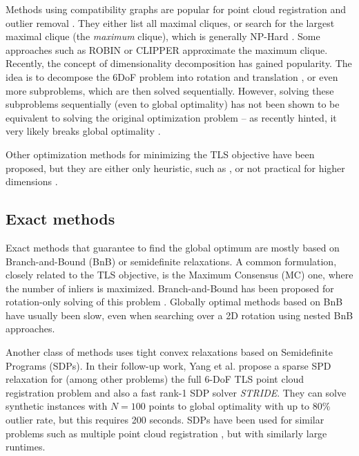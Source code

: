 Methods using compatibility graphs are popular for point cloud registration \cite{Yang20tro-teaser, SC2-PCR-Chen-2022-CVPR, 10161215, lim2024kissmatcherfastrobustpoint} and outlier removal \cite{7410607, 10091912, zhang20233d}. They either list all maximal cliques, or search for the largest maximal clique (the \textit{maximum} clique), which is generally NP-Hard \cite[p.15]{approx-algo-book-shmoys-et-al}. Some approaches such as ROBIN \cite{9562007} or CLIPPER \cite{10432947} approximate the maximum clique.
Recently, the concept of dimensionality decomposition has gained popularity. The idea is to decompose the 6DoF problem into rotation and translation \cite{Yang2020OneRT, 9485090}, or even more \cite{9878458, 10656079} subproblems, which are then solved sequentially.
However, solving these subproblems sequentially (even to global optimality) has not been shown to be equivalent to solving the original optimization problem -- as recently hinted, it very likely breaks global optimality \cite{9878458}.

Other optimization methods for minimizing the TLS objective have been proposed, but they are either only heuristic, such as \cite{Barratt2020}, or not practical for higher dimensions \cite{doi:10.1080/10618600.2017.1390471}.

\subsection{Exact methods}

Exact methods that guarantee to find the global optimum are mostly based on Branch-and-Bound (BnB) or semidefinite relaxations. A common formulation, closely related to the TLS objective, is the
Maximum Consensus (MC) one, where the number of inliers is maximized. Branch-and-Bound has been proposed for rotation-only solving of this problem \cite{4408896, 10.1007/978-3-642-37444-9_42}. Globally optimal methods based on BnB have usually been slow, even when searching over a 2D rotation \cite{9447984} using nested BnB approaches.

Another class of methods uses tight convex relaxations based on Semidefinite Programs (SDPs). In their follow-up work, Yang et al. \cite{9785843} propose a sparse SPD relaxation for (among other problems) the full 6-DoF TLS point cloud registration problem and also a fast rank-1 SDP solver \textit{STRIDE}. They can solve synthetic instances with $N=100$ points to global optimality with up to 80\% outlier rate, but this requires 200 seconds. SDPs have been used for similar problems such as multiple point cloud registration \cite{9157383}, but with similarly large runtimes.




